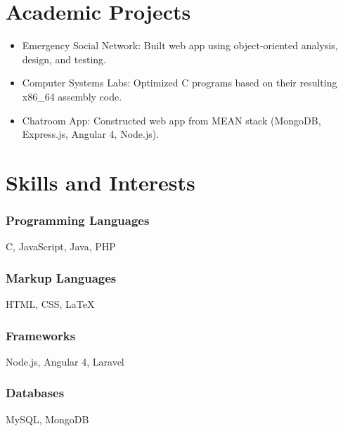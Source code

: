 \documentclass[12pt]{res} %
\begin{document}
\begin{resume}
        \section{Academic Projects}
          \begin{itemize}[leftmargin=-0.4cm]
          \itemsep0em
          \item Emergency Social Network: Built web app using object-oriented analysis, design, and testing.
          \item Computer Systems Labs: Optimized C programs based on their resulting x86\_64 assembly code.
          \item Chatroom App: Constructed web app from MEAN stack (MongoDB, Express.js, Angular 4, Node.js).
          \end{itemize}
          \vspace{-12pt}

        \section{Skills and Interests}
          \vspace{3pt}

          \begin{multicols}{3}

            \subsubsection{Programming Languages}
            \vspace{-22pt}
            C, JavaScript, Java, PHP
            \vspace{-28pt}

            \subsubsection{Markup Languages}
            \vspace{-22pt}
            HTML, CSS, \LaTeX
            \vspace{-28pt}

            \subsubsection{Frameworks}
            \vspace{-22pt}
            Node.js, Angular 4, Laravel
            \vspace{-28pt}

            \subsubsection{Databases}
            \vspace{-22pt}
            MySQL, MongoDB
            \vspace{-28pt}


\end{multicols}
\end{resume}
\end{document}
